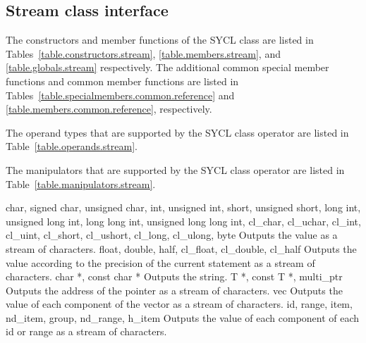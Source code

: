 \subsection{Stream class interface}

The constructors and member functions of the SYCL  class are listed in Tables~\ref{table.constructors.stream}, \ref{table.members.stream}, and \ref{table.globals.stream} respectively. The additional common special member functions and common member functions are listed in Tables~\ref{table.specialmembers.common.reference} and \ref{table.members.common.reference}, respectively.

The operand types that are supported by the SYCL  class  operator are listed in Table~\ref{table.operands.stream}.

The manipulators that are supported by the SYCL  class  operator are listed in Table~\ref{table.manipulators.stream}.



\addRow
{
  char, signed char, unsigned char, int, unsigned int, short, unsigned short, long int, unsigned long int, long long int, unsigned long long int, cl_char, cl_uchar, cl_int, cl_uint, cl_short, cl_ushort, cl_long, cl_ulong, byte
}
{
  Outputs the value as a stream of characters.
}
\addRow
{
  float, double, half, cl_float, cl_double, cl_half
}
{
  Outputs the value according to the precision of the current statement as a stream of characters.
}
\addRow
{
  char *, const char *
}
{
  Outputs the string.
}
\addRow
{
  T *, const T *, multi_ptr
}
{
  Outputs the address of the pointer as a stream of characters.
}
\addRow
{
  vec
}
{
  Outputs the value of each component of the vector as a stream of characters.
}
\addRow
{
  id, range, item, nd_item, group, nd_range, h_item
}
{
  Outputs the value of each component of each id or range as a stream of characters.
}
\completeTable

